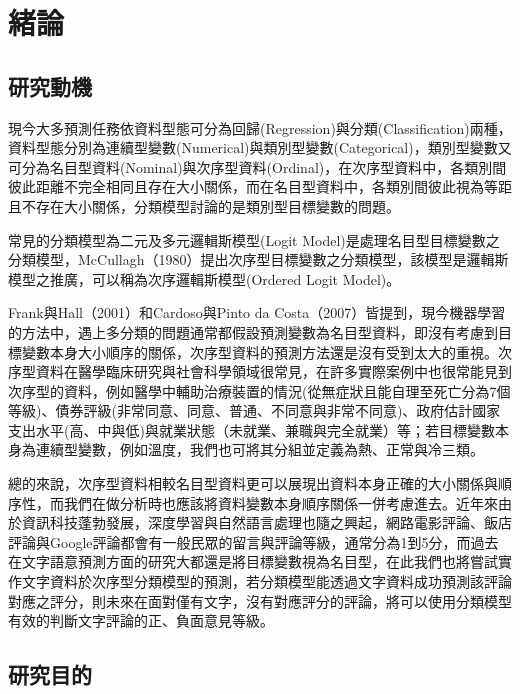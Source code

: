 %
%
\cleardoublepage
\thispagestyle{empty}
\setlength{\parindent}{2em}
\chapter{緒論}

\section{研究動機}
		
	現今大多預測任務依資料型態可分為回歸(Regression)與分類(Classification)兩種，資料型態分別為連續型變數(Numerical)與類別型變數(Categorical)，類別型變數又可分為名目型資料(Nominal)與次序型資料(Ordinal)，在次序型資料中，各類別間彼此距離不完全相同且存在大小關係，而在名目型資料中，各類別間彼此視為等距且不存在大小關係，分類模型討論的是類別型目標變數的問題。

	常見的分類模型為二元及多元邏輯斯模型(Logit Model)是處理名目型目標變數之分類模型，McCullagh（1980）提出次序型目標變數之分類模型，該模型是邏輯斯模型之推廣，可以稱為次序邏輯斯模型(Ordered Logit Model)。
	
	Frank與Hall（2001）和Cardoso與Pinto da Costa（2007）皆提到，現今機器學習的方法中，遇上多分類的問題通常都假設預測變數為名目型資料，即沒有考慮到目標變數本身大小順序的關係，次序型資料的預測方法還是沒有受到太大的重視。次序型資料在醫學臨床研究與社會科學領域很常見，在許多實際案例中也很常能見到次序型的資料，例如醫學中輔助治療裝置的情況(從無症狀且能自理至死亡分為7個等級)、債券評級(非常同意、同意、普通、不同意與非常不同意)、政府估計國家支出水平(高、中與低)與就業狀態（未就業、兼職與完全就業）等；若目標變數本身為連續型變數，例如溫度，我們也可將其分組並定義為熱、正常與冷三類。
	
	總的來說，次序型資料相較名目型資料更可以展現出資料本身正確的大小關係與順序性，而我們在做分析時也應該將資料變數本身順序關係一併考慮進去。近年來由於資訊科技蓬勃發展，深度學習與自然語言處理也隨之興起，網路電影評論、飯店評論與Google評論都會有一般民眾的留言與評論等級，通常分為1到5分，而過去在文字語意預測方面的研究大都還是將目標變數視為名目型，在此我們也將嘗試實作文字資料於次序型分類模型的預測，若分類模型能透過文字資料成功預測該評論對應之評分，則未來在面對僅有文字，沒有對應評分的評論，將可以使用分類模型有效的判斷文字評論的正、負面意見等級。
	
\section{研究目的}
	

